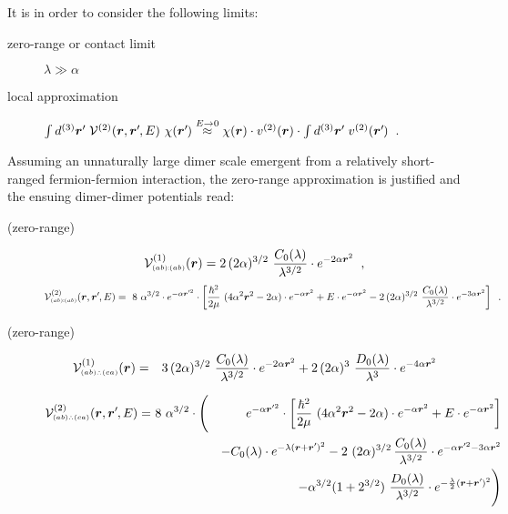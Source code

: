 \documentclass[onecolumn,preprint,superscriptaddress,nofootinbib,notitlepage,10pt,linenumbers]{revtex4-1}
\newcommand*{\mprime}{^{\prime}\mkern-1.2mu}
\newcommand{\la}{\label}
\newcommand{\be}{\begin{equation}}
\newcommand{\ee}{\end{equation}}
\newcommand{\ve}[1]{\ensuremath{\boldsymbol{#1}}}
\newcommand{\abab}{\ensuremath $(ab)\!\!:\!\!(ab)$}
\newcommand{\abca}{\ensuremath $(ab)\wasytherefore(ca)$}
\begin{document}
It is in order to consider the following limits: 
\begin{description}
\item[zero-range or contact limit]$\lambda\gg\alpha$
\item[local approximation]
$\int d^{(3)}\ve{r}\mprime~\mathcal{V}^{(2)}(\ve{r},\ve{r}\mprime,E)~\chi(\ve{r}\mprime)\stackrel{E\to 0}{\approx}
\chi(\ve{r})\cdot v^{(2)}(\ve{r})\cdot\int d^{(3)}\ve{r}\mprime~v^{(2)}(\ve{r}\mprime)$~.
\end{description}

Assuming an unnaturally large dimer scale emergent from a relatively short-ranged fermion-fermion interaction,
the zero-range approximation is justified and the ensuing dimer-dimer potentials read:

\begin{description}
	\item[(zero-range)~\abab]
\be\la{eq.local.abab}
\mathcal{V}^{(1)}_{\text{\tiny\abab}}(\ve{r})=
2\,(2\alpha)^{3/2}~\frac{C_0(\lambda)}{\lambda^{3/2}}\cdot
 e^{-2\alpha\ve{r}^2}\;\;,
\ee
\be\la{eq.nonlocal.abab}
\mathcal{V}^{(2)}_{\text{\tiny\abab}}(\ve{r},\ve{r}\mprime,E)=
~8~\alpha^{3/2}\cdot e^{-\alpha\ve{r}\mprime^2}\cdot
\left[\frac{\hbar^2}{2\mu}~(4\alpha^2\ve{r}^2-2\alpha)
\cdot e^{-\alpha\ve{r}^2}+
E\cdot e^{-\alpha\ve{r}^2}
-2\,(2\alpha)^{3/2}~\frac{C_0(\lambda)}{\lambda^{3/2}}\cdot
 e^{-3\alpha\ve{r}^2}\right]\;\;.
\ee

\item[(zero-range)~\abca]
\begin{eqnarray}\la{eq.local.abca}
\mathcal{V}^{(1)}_{\text{\tiny\abca}}(\ve{r})&=&
3\,(2\alpha)^{3/2}~\frac{C_0(\lambda)}{\lambda^{3/2}}\cdot
 e^{-2\alpha\ve{r}^2}
 +2\,(2\alpha)^{3}~\frac{D_0(\lambda)}{\lambda^{3}}\cdot
 e^{-4\alpha\ve{r}^2}
\end{eqnarray}


\begin{eqnarray}\la{eq.nonlocal.abca}
\mathcal{V}^{(2)}_{\text{\tiny\abca}}(\ve{r},\ve{r}\mprime,E)=&~8~\alpha^{3/2}\cdot\Bigg(&e^{-\alpha\ve{r}\mprime^2}\cdot
\left[\frac{\hbar^2}{2\mu}~(4\alpha^2\ve{r}^2-2\alpha)
\cdot e^{-\alpha\ve{r}^2}+
E\cdot e^{-\alpha\ve{r}^2}\right]\\
&&-C_0(\lambda)\cdot
 e^{-\lambda(\ve{r}+\ve{r}\mprime)^2}
-2~(2\alpha)^{3/2}\,\frac{C_0(\lambda)}{\lambda^{3/2}}\cdot
 e^{-\alpha\ve{r}\mprime^2-3\alpha\ve{r}^2}\\
 &&-\alpha^{3/2}(1+2^{3/2})~\frac{D_0(\lambda)}{\lambda^{3/2}}\cdot
 e^{-\frac{\lambda}{2}(\ve{r}+\ve{r}\mprime)^2}\Bigg)
\end{eqnarray}

\end{description}
\end{document}
